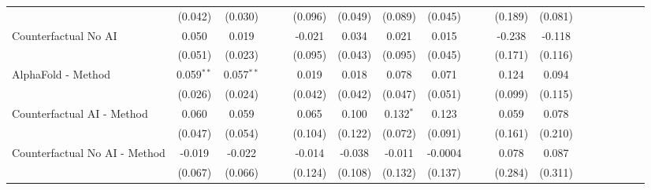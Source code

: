 \begin{tabular}{lcccccccccccccccccc}
                                                              & (0.042)        & (0.030)        &     &     & (0.096)        & (0.049)        & (0.089)     & (0.045) &     &      & (0.189)       & (0.081)       &      &      &      &      &      &   \\   
   Counterfactual No AI                                       & 0.050          & 0.019          &     &     & -0.021         & 0.034          & 0.021       & 0.015   &     &      & -0.238        & -0.118        &      &      &      &      &      &   \\   
                                                              & (0.051)        & (0.023)        &     &     & (0.095)        & (0.043)        & (0.095)     & (0.045) &     &      & (0.171)       & (0.116)       &      &      &      &      &      &   \\   
   AlphaFold - Method                                         & 0.059$^{**}$   & 0.057$^{**}$   &     &     & 0.019          & 0.018          & 0.078       & 0.071   &     &      & 0.124         & 0.094         &      &      &      &      &      &   \\   
                                                              & (0.026)        & (0.024)        &     &     & (0.042)        & (0.042)        & (0.047)     & (0.051) &     &      & (0.099)       & (0.115)       &      &      &      &      &      &   \\   
   Counterfactual AI - Method                                 & 0.060          & 0.059          &     &     & 0.065          & 0.100          & 0.132$^{*}$ & 0.123   &     &      & 0.059         & 0.078         &      &      &      &      &      &   \\   
                                                              & (0.047)        & (0.054)        &     &     & (0.104)        & (0.122)        & (0.072)     & (0.091) &     &      & (0.161)       & (0.210)       &      &      &      &      &      &   \\   
   Counterfactual No AI - Method                              & -0.019         & -0.022         &     &     & -0.014         & -0.038         & -0.011      & -0.0004 &     &      & 0.078         & 0.087         &      &      &      &      &      &   \\   
                                                              & (0.067)        & (0.066)        &     &     & (0.124)        & (0.108)        & (0.132)     & (0.137) &     &      & (0.284)       & (0.311)       &      &      &      &      &      &   \\   

\end{tabular}
